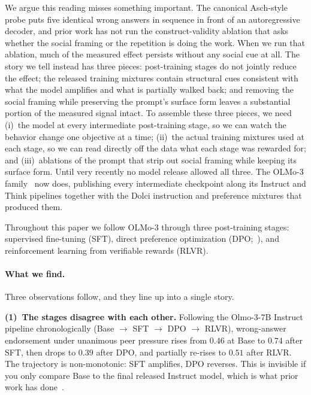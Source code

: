 \documentclass{article}
\begin{document}
We argue this reading misses something important. The canonical Asch-style probe puts five identical wrong answers in sequence in front of an autoregressive decoder, and prior work has not run the construct-validity ablation that asks whether the social framing or the repetition is doing the work. When we run that ablation, much of the measured effect persists without any social cue at all. The story we tell instead has three pieces: post-training stages do not jointly reduce the effect; the released training mixtures contain structural cues consistent with what the model amplifies and what is partially walked back; and removing the social framing while preserving the prompt's surface form leaves a substantial portion of the measured signal intact. To assemble these three pieces, we need (i)~the model at every intermediate post-training stage, so we can watch the behavior change one objective at a time; (ii)~the actual training mixtures used at each stage, so we can read directly off the data what each stage was rewarded for; and (iii)~ablations of the prompt that strip out social framing while keeping its surface form. Until very recently no model release allowed all three. The OLMo-3 family~\citep{olmo3} now does, publishing every intermediate checkpoint along its Instruct and Think pipelines together with the Dolci instruction and preference mixtures that produced them.

Throughout this paper we follow OLMo-3 through three post-training stages: supervised fine-tuning (SFT), direct preference optimization (DPO;~\citealt{rafailov2023dpo}), and reinforcement learning from verifiable rewards (RLVR).

\paragraph{What we find.}
Three observations follow, and they line up into a single story.

\textbf{(1)~The stages disagree with each other.} Following the Olmo-3-7B Instruct pipeline chronologically (Base $\to$ SFT $\to$ DPO $\to$ RLVR), wrong-answer endorsement under unanimous peer pressure rises from $0.46$ at Base to $0.74$ after SFT, then drops to $0.39$ after DPO, and partially re-rises to $0.51$ after RLVR. The trajectory is non-monotonic: SFT amplifies, DPO reverses. This is invisible if you only compare Base to the final released Instruct model, which is what prior work has done~\citep{zhu2025conformity}.
\end{document}

